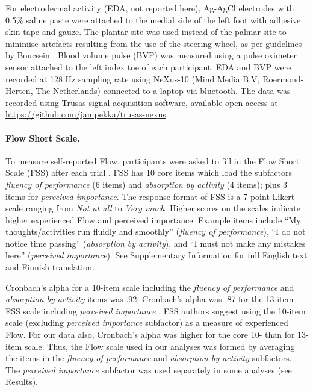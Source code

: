 \documentclass[fleqn,10pt]{wlscirep}
\begin{document}
For electrodermal activity (EDA, not reported here), Ag-AgCl electrodes with 0.5\% saline paste were attached to the medial side of the left foot with adhesive skin tape and gauze. The plantar site was used instead of the palmar site to minimise artefacts resulting from the use of the steering wheel, as per guidelines by Boucsein \cite{boucs12}. Blood volume pulse (BVP) was measured using a pulse oximeter sensor attached to the left index toe of each participant. EDA and BVP were recorded at 128 Hz sampling rate using NeXus-10 (Mind Media B.V, Roermond-Herten, The Netherlands) connected to a laptop via bluetooth. The data was recorded using Trusas signal acquisition software, available open access at \url{https://github.com/jampekka/trusas-nexus}.

\paragraph{Flow Short Scale.} To measure self-reported Flow, participants were asked to fill in the Flow Short Scale (FSS) after each trial \cite{Rheinberg2003,Engeser2008}. FSS has 10 core items which load the subfactors {\it fluency of performance} (6 items) and {\it absorption by activity} (4 items); plus 3 items for {\it perceived importance}. The response format of FSS is a 7-point Likert scale ranging from {\it Not at all} to {\it Very much}. Higher scores on the scales indicate higher experienced Flow and perceived importance. Example items include ``My thoughts/activities run fluidly and smoothly'' ({\it fluency of performance}), ``I do not notice time passing'' ({\it absorption by activity}), and ``I must not make any mistakes here'' ({\it perceived importance}). See Supplementary Information for full English text and Finnish translation.

Cronbach’s alpha for a 10-item scale including the {\it fluency of performance} and {\it absorption by activity} items was .92; Cronbach’s alpha was .87 for the 13-item FSS scale including {\it perceived importance} \cite{Rheinberg2003}. FSS authors \cite{Rheinberg2003} suggest using the 10-item scale (excluding {\it perceived importance} subfactor) as a measure of experienced Flow. For our data also, Cronbach's alpha was higher for the core 10- than for 13-item scale. Thus, the Flow scale used in our analyses was formed by averaging the items in the {\it fluency of performance} and {\it absorption by activity} subfactors. The {\it perceived importance} subfactor was used separately in some analyses (see Results).
\end{document}
